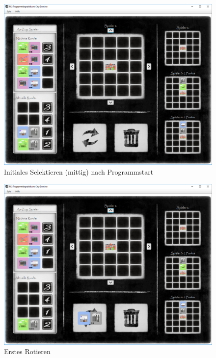 \begin{figure}
	\centering
	\includegraphics{screenshots/screenshot_InitialesSelektieren2.png}
	\caption[Initiales Selektieren - mittig]{Initiales Selektieren (mittig) nach Programmstart}
	\label{fig:initialesSelektierenMittig}
\end{figure}


\begin{figure}
	\centering
	\includegraphics{screenshots/screenshot_ErstesRotieren.png}
	\caption{Erstes Rotieren}
	\label{fig:erstesRotieren}
\end{figure}

